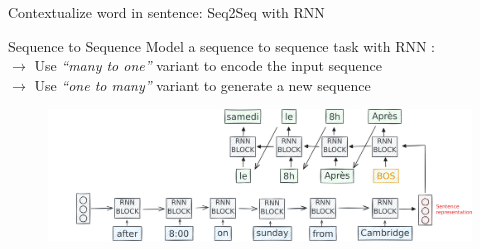 \documentclass[10pt,aspectratio=169]{beamer}
\begin{document}
  \begin{frame}[noframenumbering]{Contextualize word in sentence: Seq2Seq with RNN}

    \begin{block}{Sequence to Sequence}
      \vspace{.1cm}
      {\footnotesize
        Model a sequence to sequence task with RNN :\\ 
        $\rightarrow $ Use \textit{``many to one''} variant to encode the input sequence\\
        $\rightarrow $ Use \textit{``one to many''} variant to generate a new sequence\\
      } 
    \end{block}

    \begin{figure}
      \centering
      \includegraphics[width=1.\textwidth]{img/RNN-example-seq2seq-3.pdf}
    \end{figure}


  \end{frame}
\end{document}
